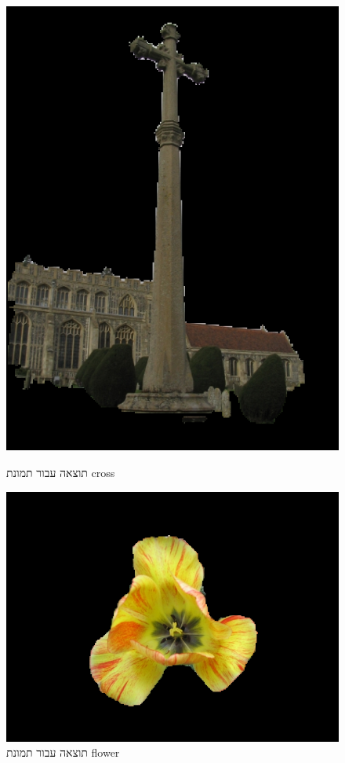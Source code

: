 \documentclass[a4paper,12pt]{article}
\begin{document}
\begin{figure}[H]
\begin{minipage}{0.3\textwidth}
        \includegraphics[width=\textwidth]{my_reasults/final_img/cross_result.png}
        \caption{תוצאה עבור תמונת cross}
    \end{minipage}
    \hfill
    \begin{minipage}{0.3\textwidth}
        \centering
        \includegraphics[width=\textwidth]{my_reasults/final_img/flower_result.png}
        \caption{תוצאה עבור תמונת flower}
    \end{minipage}
\end{figure}
\end{document}
